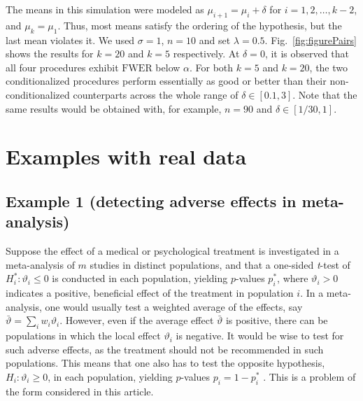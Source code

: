 \documentclass {imsart}
\newcommand{\FWER}{\text{$\mathrm{FWER}$}}
\begin{document}
The means in this simulation were modeled as $\mu_{i+1}=\mu_i+\delta$ for $i=1,2,\ldots,k-2$, and $\mu_k = \mu_1$. Thus, most means satisfy the ordering of the hypothesis, but the last mean violates it. We used $\sigma = 1$, $n = 10$ and set $\lambda = 0.5$. Fig.~\ref{fig:figurePairs} shows the results for $k = 20$ and $k = 5$ respectively. At $\delta = 0$, it is observed that all four procedures exhibit $\FWER$ below $\alpha$. For both $k = 5$ and $k = 20$, the two conditionalized procedures perform essentially as good or better than their non-conditionalized counterparts across the whole range of $\delta \in [0.1, 3]$. Note that the same results would be obtained with, for example, $n = 90$ and $\delta \in [1/30, 1]$.








\section {Examples with real data}
\subsection{Example 1 (detecting adverse effects in meta-analysis)}

Suppose the effect of a medical or psychological treatment is investigated in a meta-analysis of $m$ studies in distinct populations, and that a one-sided \textit{t}-test of $H_i^*: \vartheta_i \le 0$ is conducted in each population, yielding $p$-values $p^*_i$, where $\vartheta_i > 0$ indicates a positive, beneficial effect of the treatment in population $i$. In a meta-analysis, one would usually test a weighted average of the effects, say $\bar{\vartheta}=\sum\nolimits_iw_i\vartheta_i$. However, even if the average effect $\bar{\vartheta}$ is positive, there can be populations in which the local effect $\vartheta_i$ is negative. It would be wise to test for such adverse effects, as the treatment should not be recommended in such populations. This means that one also has to test the opposite hypothesis, $H_i: \vartheta_i \ge 0$, in each population, yielding $p$-values $p_i = 1 - p^*_i$ . This is a problem of the form considered in this article.
\end{document}
